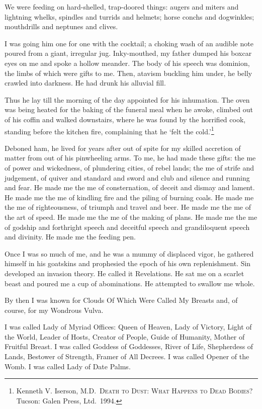 \documentclass[
]{memoir}
\begin{document}
We were feeding on hard-shelled, trap-doored things: augers and miters
and lightning whelks, spindles and turrids and helmets; horse conchs and
dogwinkles; mouthdrills and neptunes and clives.

I was going him one for one with the cocktail; a choking wash of an
audible note poured from a giant, irregular jug. Inky-mouthed, my father
dumped his boxcar eyes on me and spoke a hollow meander. The body of his
speech was dominion, the limbs of which were gifts to me. Then, atavism
buckling him under, he belly crawled into darkness. He had drunk his
alluvial fill.

Thus he lay till the morning of the day appointed for his inhumation.
The oven was being heated for the baking of the funeral meal when he
awoke, climbed out of his coffin and walked downstairs, where he was
found by the horrified cook, standing before the kitchen fire,
complaining that he `felt the cold.'\footnote{Kenneth V. Iserson,
  M.D.~\textsc{Death to Dust: What Happens to Dead Bodies?} Tucson:
  Galen Press, Ltd.~1994.}

Deboned ham, he lived for years after out of spite for my skilled
accretion of matter from out of his pinwheeling arms. To me, he had made
these gifts: the me of power and wickedness, of plundering cities, of
rebel lands; the me of strife and judgement, of quiver and standard and
sword and club and silence and running and fear. He made me the me of
consternation, of deceit and dismay and lament. He made me the me of
kindling fire and the piling of burning coals. He made me the me of
righteousness, of triumph and travel and beer. He made me the me of the
art of speed. He made me the me of the making of plans. He made me the
me of godship and forthright speech and deceitful speech and
grandiloquent speech and divinity. He made me the feeding pen.

Once I was so much of me, and he was a mummy of displaced vigor, he
gathered himself in his goatskins and prophesied the epoch of his own
replenishment. Sin developed an invasion theory. He called it
Revelations. He sat me on a scarlet beast and poured me a cup of
abominations. He attempted to swallow me whole.

By then I was known for Clouds Of Which Were Called My Breasts and, of
course, for my Wondrous Vulva.

I was called Lady of Myriad Offices: Queen of Heaven, Lady of Victory,
Light of the World, Leader of Hosts, Creator of People, Guide of
Humanity, Mother of Fruitful Breast. I was called Goddess of Goddesses,
River of Life, Shepherdess of Lands, Bestower of Strength, Framer of All
Decrees. I was called Opener of the Womb. I was called Lady of Date
Palms.
\end{document}
